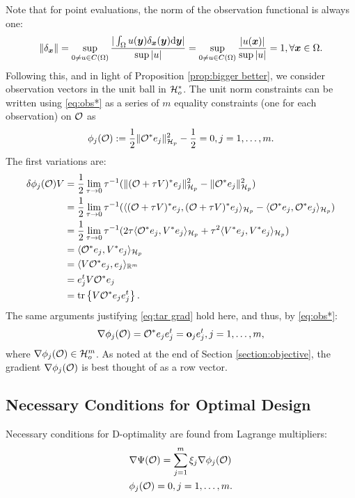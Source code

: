 Note that for point evaluations, the norm of the observation
functional is always one:
\begin{align*}
  \| \delta_{\x} \| = \sup_{0 \neq u \in C(\Omega)} \frac{
    |\int_{\Omega}u(\y) \delta_{\x}(\y) \der \y| 
  }{
    \sup|u|}
  = \sup_{0 \neq u \in C(\Omega)} \frac{|u(\x)|}{ \sup|u|} = 1,
  \forall \x \in \Omega.
\end{align*}
Following this, and in light of Proposition \ref{prop:bigger better},
we consider observation vectors in the unit ball in $\mathcal{H}_o^*$. The
unit norm constraints can be written using \eqref{eq:obs*} as a series
of $m$ equality constraints (one for each observation) on $\mathcal{O}$ as
\begin{align}\label{eq:constraints}
  \phi_j(\obs) :=\frac12 \| \obs^* e_j\|_{\hilp}^2 - \frac12 = 0,j=1,\dots,m.
\end{align}
The first variations are:
\begin{align*}
  \delta \phi_j(\obs)V  
  &= \frac12\lim_{\tau \to 0}\tau^{-1}
  ( \|(\obs + \tau V)^*e_j \|_{\hilp}^2 - \|\obs ^*e_j \|_{\hilp}^2  ) \\
  &= \frac12\lim_{\tau \to 0}\tau^{-1}
  ( \langle (\obs + \tau V)^*e_j, (\obs + \tau V)^*e_j \rangle_{\hilp} - 
  \langle \obs^*e_j, \obs^*e_j \rangle_{\hilp} ) \\
  &= \frac12\lim_{\tau \to 0}\tau^{-1}
  (2\tau \langle \obs^*e_j,V^*e_j \rangle_{\hilp} 
  +\tau^2 \langle V^*e_j, V^*e_j \rangle_{\hilp} ) \\
  &= \langle \obs^*e_j,V^*e_j \rangle_{\hilp} \\
  &= \langle V \obs^*e_j,e_j \rangle_{\R^m} \\
  &= e_j^t V \obs^* e_j \\
  &= \tr{V \obs^* e_je_j^t}.
\end{align*}
The same arguments justifying \eqref{eq:tar grad} hold here, and thus, by \eqref{eq:obs*}:
\begin{align}\label{eq:grad constraints}
\nabla \phi_j(\obs) = \obs^* e_j e_j^t = \meas_j e_j^t , j=1,\dots,m,
\end{align}
where $\nabla \phi_j(\mathcal{O}) \in \mathcal{H}_o^m$. As noted at the end of
Section \ref{section:objective}, the gradient $\nabla \phi_j(\mathcal{O})$ is
best thought of as a row vector.

\subsection{Necessary Conditions for Optimal Design}\label{subsec:necessary}
Necessary conditions for D-optimality are found from Lagrange
multipliers:
\begin{align}
  &\nabla \tar(\obs) = \sum_{j=1}^m \xi_j \nabla \phi_j (\obs)
  \label{eq:Lagrange mult1} \\
    &\phi_j(\obs) = 0, j = 1,\dots,m. \label{eq:Lagrange mult2}
\end{align}

